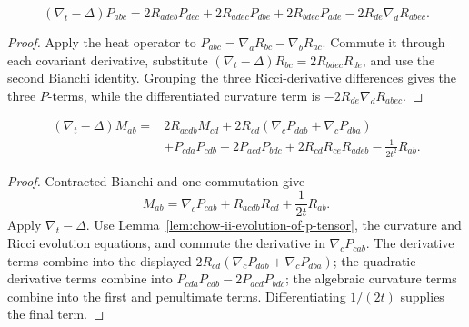 \begin{lemma}
\label{lem:chow-ii-evolution-of-p-tensor}


\[
(\nabla_t-\Delta)P_{abc}=2R_{adeb}P_{dec}+2R_{adec}P_{dbe}
+2R_{bdec}P_{ade}-2R_{de}\nabla_dR_{abec}.
\]
\end{lemma}
\begin{proof}
\sketch Apply the heat operator to
\(P_{abc}=\nabla_aR_{bc}-\nabla_bR_{ac}\).  Commute it through each
covariant derivative, substitute
\((\nabla_t-\Delta)R_{bc}=2R_{bdec}R_{de}\), and use the second Bianchi
identity.  Grouping the three Ricci-derivative differences gives the three
\(P\)-terms, while the differentiated curvature term is
\(-2R_{de}\nabla_dR_{abec}\).
\end{proof}

\begin{lemma}
\label{lem:chow-ii-evolution-of-m-tensor}


\[
\begin{aligned}
(\nabla_t-\Delta)M_{ab}={}&2R_{acdb}M_{cd}
+2R_{cd}(\nabla_cP_{dab}+\nabla_cP_{dba})\\
&+P_{cda}P_{cdb}-2P_{acd}P_{bdc}
+2R_{cd}R_{ce}R_{adeb}-\frac1{2t^2}R_{ab}.
\end{aligned}
\]
\end{lemma}
\begin{proof}
\sketch Contracted Bianchi and one commutation give
\[
M_{ab}=\nabla_cP_{cab}+R_{acdb}R_{cd}+\frac1{2t}R_{ab}.
\]
Apply \(\nabla_t-\Delta\).  Use Lemma~\ref{lem:chow-ii-evolution-of-p-tensor},
the curvature and Ricci evolution equations, and commute the derivative in
\(\nabla_cP_{cab}\).  The derivative terms combine into the displayed
\(2R_{cd}(\nabla_cP_{dab}+\nabla_cP_{dba})\); the quadratic derivative terms
combine into \(P_{cda}P_{cdb}-2P_{acd}P_{bdc}\); the algebraic curvature
terms combine into the first and penultimate terms.  Differentiating
\(1/(2t)\) supplies the final term.
\end{proof}

